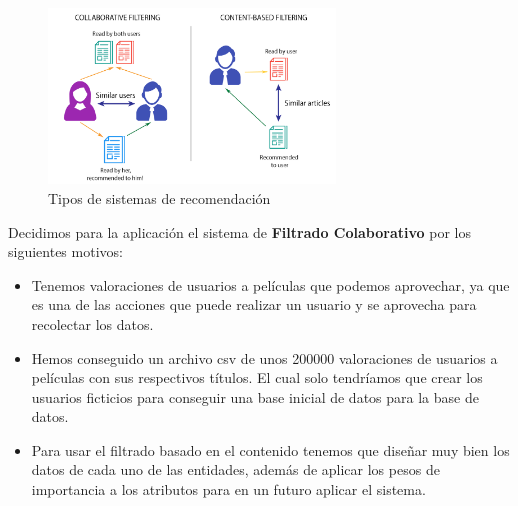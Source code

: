 \begin{figure}[H]
    \centering
    \includegraphics[width=3in, angle=0]{figures/chapter-2/recommendation_systems.png}
    \caption{Tipos de sistemas de recomendación}
\end{figure}

Decidimos para la aplicación el sistema de \textbf{Filtrado Colaborativo} por los siguientes motivos:

\begin{itemize}
    \item Tenemos valoraciones de usuarios a películas que podemos aprovechar, ya que es una de las acciones que puede realizar un usuario y se aprovecha para recolectar los datos.
    \item Hemos conseguido un archivo csv de unos 200000 valoraciones de usuarios a películas con sus respectivos títulos. El cual solo tendríamos que crear los usuarios ficticios para conseguir una base inicial de datos para la base de datos.
    \item Para usar el filtrado basado en el contenido tenemos que diseñar muy bien los datos de cada uno de las entidades, además de aplicar los pesos de importancia a los atributos para en un futuro aplicar el sistema.  
\end{itemize} 

